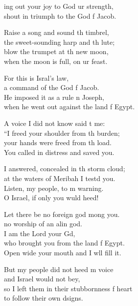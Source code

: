 \settowidth{\versewidth}{so I left them in their stubbornness of heart *}
\begin{psalmverse}%
  \begin{patverse}
ing out your joy to God ur strength,\Med\\
shout in triumph to the God f Jacob.

Raise a song and sound th timbrel,\Med\\
the sweet-sounding harp and th lute;\\
blow the trumpet at th new moon,\Med\\
when the moon is full, on ur feast.

For this is Isral’s law,\Med\\
a command of the God f Jacob.\\
He imposed it as a rule n Joseph,\Med\\
when he went out against the land f Egypt.

A voice I did not know said t me:\Med\\
“I freed your shoulder from th burden;\\
your hands were freed from th load.\Med\\
You called in distress and  saved you.

I answered, concealed in th storm cloud;\Med\\
at the waters of Meribah I testd you.\\
Listen, my people, to m warning.\Med\\
O Israel, if only you wuld heed!

Let there be no foreign god mong you.\Med\\
no worship of an alin god.\\
I am the Lord your Gd,\Flex\\
who brought you from the land f Egypt.\Med\\
Open wide your mouth and I w\pointup{\i}ll fill it.

But my people did not heed m voice\Med\\
and Israel would not bey,\\
so I left them in their stubbornness f heart\Med\\
to follow their own dsigns.


\end{patverse}
\end{psalmverse}

